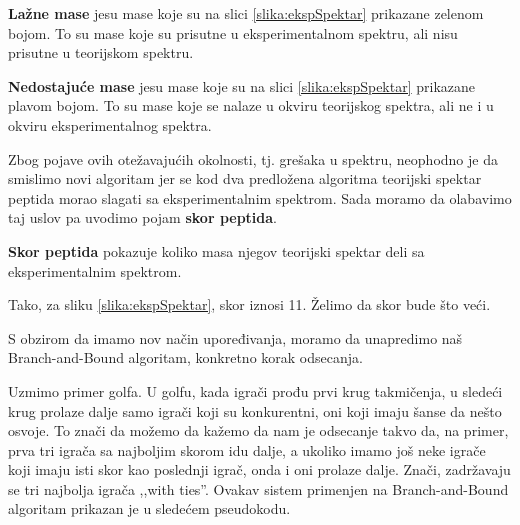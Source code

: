 \textbf{Lažne mase} jesu mase koje su na slici \ref{slika:ekspSpektar} prikazane zelenom bojom. To su mase koje su prisutne u eksperimentalnom spektru, ali nisu prisutne u teorijskom spektru.

\textbf{Nedostajuće mase} jesu mase koje su na slici \ref{slika:ekspSpektar} prikazane plavom bojom. To su mase koje se nalaze u okviru teorijskog spektra, ali ne i u okviru eksperimentalnog spektra.

Zbog pojave ovih otežavajućih okolnosti, tj. grešaka u spektru, neophodno je da smislimo novi algoritam jer se kod dva predložena algoritma teorijski spektar peptida morao slagati sa eksperimentalnim spektrom. Sada moramo da olabavimo taj uslov pa uvodimo pojam \textbf{skor peptida}.

\begin{definicija}
\textbf{Skor peptida} pokazuje koliko masa njegov teorijski spektar deli sa eksperimentalnim spektrom.
\end{definicija}

\noindent Tako, za sliku \ref{slika:ekspSpektar}, skor iznosi 11. Želimo da skor bude što veći.

S obzirom da imamo nov način upoređivanja, moramo da unapredimo naš Branch-and-Bound algoritam, konkretno korak odsecanja. 

Uzmimo primer golfa. U golfu, kada igrači prođu prvi krug takmičenja, u sledeći krug prolaze dalje samo igrači koji su konkurentni, oni koji imaju šanse da nešto osvoje. To znači da možemo da kažemo da nam je odsecanje takvo da, na primer, prva tri igrača sa najboljim skorom idu dalje, a ukoliko imamo još neke igrače koji imaju isti skor kao poslednji igrač, onda i oni prolaze dalje. Znači, zadržavaju se tri najbolja igrača ,,with ties''. Ovakav sistem primenjen na Branch-and-Bound algoritam prikazan je u sledećem pseudokodu.

